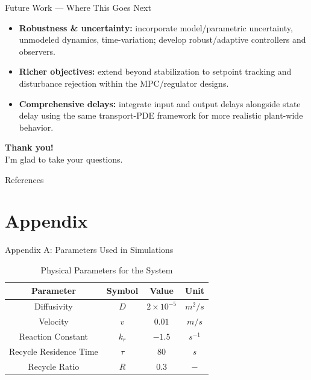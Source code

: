 \documentclass[8pt]{beamer}
\begin{document}
\begin{frame}[t]{Future Work — Where This Goes Next}
\begin{itemize}
  \item \textbf{Robustness \& uncertainty:} incorporate model/parametric uncertainty, unmodeled dynamics, time-variation; develop robust/adaptive controllers and observers.
  \item \textbf{Richer objectives:} extend beyond stabilization to setpoint tracking and disturbance rejection within the MPC/regulator designs.
  \item \textbf{Comprehensive delays:} integrate input and output delays alongside state delay using the same transport-PDE framework for more realistic plant-wide behavior.
\end{itemize}
\end{frame}


{
\begin{frame}[c, plain]
\centering
\textcolor{ualberta_darkgreen}{\LARGE \textbf{Thank you!}}\\[1ex]
\textcolor{ualberta_lightgreen}{\large I'm glad to take your questions.}
\end{frame}
}

\begin{frame}[allowframebreaks]{References}
\end{frame}

\appendix
\section{Appendix}
\begin{frame}{Appendix A: Parameters Used in Simulations}
\begin{table}[ht]
    \centering
    \caption{Physical Parameters for the System}
    \label{tab:pars}
    \begin{tabular}{|c|c|c|c|}
    \hline
    \textbf{Parameter}        & \textbf{Symbol} & \textbf{Value}     & \textbf{Unit}    \\ \hline
    Diffusivity               & $D$             & $2\times10^{-5}$   & ${m^2}/{s}$      \\ \hline
    Velocity                  & $v$             & $0.01$   & ${m}/{s}$        \\ \hline
    Reaction Constant         & $k_r$           & $-1.5$              & $s^{-1}$         \\ \hline
    Recycle Residence Time    & $\tau$          & $80$               & $s$              \\ \hline
    Recycle Ratio             & $R$             & $0.3$              & $-$              \\ \hline
    \end{tabular}
\end{table}
\end{frame}
\end{document}
